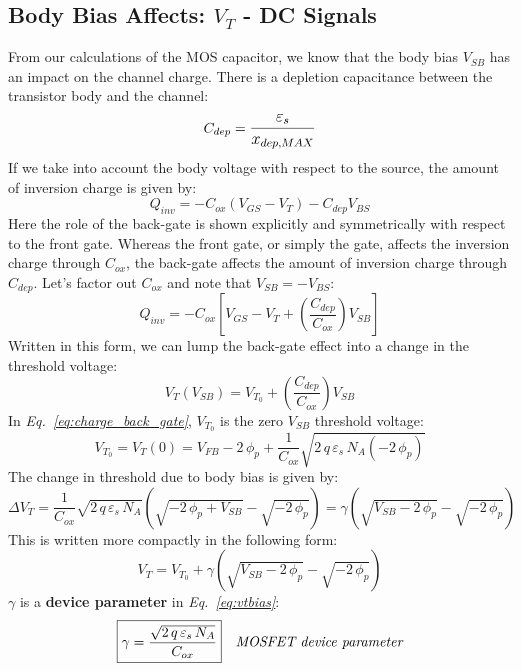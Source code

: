 \subsection{Body Bias Affects: \texorpdfstring{$V_T$}{Threshold Voltage} - DC Signals}
From our calculations of the MOS capacitor, we know that the body bias $V_{SB}$ has an impact on the channel charge.  There is a depletion capacitance between the transistor body and the channel:
    \begin{equation}
        C_{dep} = \mathlarger{\frac{\varepsilon_s}{x_{dep,MAX}}}
    \end{equation}
If we take into account the body voltage with respect to the source, the amount of inversion charge is given by:
    \begin{equation}
        Q_{inv} =  -C_{ox}(V_{GS} - V_T) - C_{dep}V_{BS}
    \end{equation}
Here the role of the back-gate is shown explicitly and symmetrically with respect to the front gate.  Whereas the front gate, or simply the gate, affects the inversion charge through $C_{ox}$, the back-gate affects the amount of inversion charge through $C_{dep}$.  Let's factor out $C_{ox}$ and note that $V_{SB} = - V_{BS}$:
    \begin{equation}
        Q_{inv} =  -C_{ox}\left[ {V_{GS} - V_T + \left( \frac{C_{dep}}{C_{ox}} \right)V_{SB}} \right]
    \end{equation}
Written in this form, we can lump the back-gate effect into a change in the threshold voltage:
    \begin{equation}
        V_T(V_{SB}) = V_{T_0} + \left( \frac{C_{dep}}{C_{ox}} \right)V_{SB}
        \label{eq:charge_back_gate}
    \end{equation}
In \emph{Eq.~\ref{eq:charge_back_gate}}, $V_{T_0}$ is the zero $V_{SB}$ threshold voltage:
    \begin{equation}
        V_{T_0} = V_T(0) = V_{FB} - 2\,\phi_p + \frac{1}{C_{ox}} \sqrt{2\,q\,\varepsilon_s\,N_A(-2\,\phi_p)}
    \end{equation}
The change in threshold due to body bias is given by:
    \begin{equation}
        \Delta V_T = \frac{1}{C_{ox}} \sqrt{2\,q\,\varepsilon_s\,N_A} \left(\sqrt{-2\,\phi_p + V_{SB}} - \sqrt{-2\,\phi_p} \right)
        = \gamma \left( {\sqrt{V_{SB} - 2\,\phi_p} - \sqrt{-2\,\phi_p}} \right)
    \end{equation}
This is written more compactly in the following form:
    \begin{equation}
        V_T = V_{T_0} + \gamma \left( \sqrt{V_{SB} - 2\,\phi_p} - \sqrt{-2\,\phi_p} \right)
        \label{eq:vtbias}
    \end{equation}
$\gamma$ is a \textbf{device parameter} in \emph{Eq.~\ref{eq:vtbias}}:
    \begin{align}
        \Aboxed{\gamma &= \frac{\sqrt{2\,q\,\varepsilon_s\,N_A}}{C_{ox}}} &\textit{MOSFET device parameter}
    \end{align}
